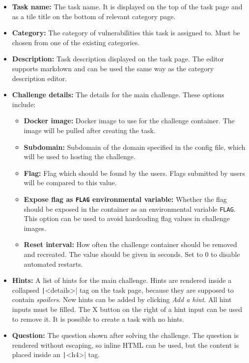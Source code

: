 \begin{itemize}
    \item \textbf{Task name:} The task name. It is displayed on the top of the task page and as a tile title on the bottom of relevant category page.
    \item \textbf{Category:} The category of vulnerabilities this task is assigned to. Must be chosen from one of the existing categories.
    \item \textbf{Description:} Task description displayed on the task page. The editor supports markdown and can be used the same way as the category description editor.
    \item \textbf{Challenge details:} The details for the main challenge. These options include:
    \begin{itemize}
        \item \textbf{Docker image:} Docker image to use for the challenge container. The image will be pulled after creating the task.
        \item \textbf{Subdomain:} Subdomain of the domain specified in the config file, which will be used to hosting the challenge.
        \item \textbf{Flag:} Flag which should be found by the users. Flags submitted by users will be compared to this value.
        \item \textbf{Expose flag as \texttt{FLAG} environmental variable:} Whether the flag should be exposed in the container as an environmental variable \texttt{FLAG}. This option can be used to avoid hardcoding flag values in challenge images.
        \item \textbf{Reset interval:} How often the challenge container should be removed and recreated. The value should be given in seconds. Set to 0 to disable automated restarts.
    \end{itemize}
    \item \textbf{Hints:} A list of hints for the main challenge. Hints are rendered inside a collapsed \texttt|<details>| tag on the task page, because they are supposed to contain \textit{spoilers}. New hints can be added by clicking \textit{Add a hint}. All hint inputs must be filled. The X button on the right of a hint input can be used to remove it. It is possible to create a task with no hints.
    \item \textbf{Question:} The question shown after solving the challenge. The question is rendered without escaping, so inline HTML can be used, but the content is placed inside an \texttt|<h4>| tag.

\end{itemize}
